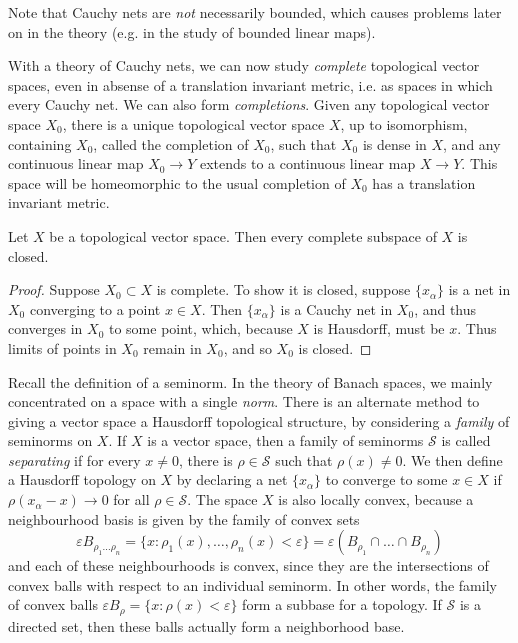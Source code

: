 Note that Cauchy nets are \emph{not} necessarily bounded, which causes problems later on in the theory (e.g. in the study of bounded linear maps).

With a theory of Cauchy nets, we can now study \emph{complete} topological vector spaces, even in absense of a translation invariant metric, i.e. as spaces in which every Cauchy net. We can also form \emph{completions}. Given any topological vector space $X_0$, there is a unique topological vector space $X$, up to isomorphism, containing $X_0$, called the completion of $X_0$, such that $X_0$ is dense in $X$, and any continuous linear map $X_0 \to Y$ extends to a continuous linear map $X \to Y$. This space will be homeomorphic to the usual completion of $X_0$ has a translation invariant metric.

\begin{theorem}
    Let $X$ be a topological vector space. Then every complete subspace of $X$ is closed.
\end{theorem}
\begin{proof}
    Suppose $X_0 \subset X$ is complete. To show it is closed, suppose $\{ x_\alpha \}$ is a net in $X_0$ converging to a point $x \in X$. Then $\{ x_\alpha \}$ is a Cauchy net in $X_0$, and thus converges in $X_0$ to some point, which, because $X$ is Hausdorff, must be $x$. Thus limits of points in $X_0$ remain in $X_0$, and so $X_0$ is closed.
\end{proof}

Recall the definition of a seminorm. In the theory of Banach spaces, we mainly concentrated on a space with a single \emph{norm}. There is an alternate method to giving a vector space a Hausdorff topological structure, by considering a \emph{family} of seminorms on $X$. If $X$ is a vector space, then a family of seminorms $\mathcal{S}$ is called \emph{separating} if for every $x \neq 0$, there is $\rho \in \mathcal{S}$ such that $\rho(x) \neq 0$. We then define a Hausdorff topology on $X$ by declaring a net $\{ x_\alpha \}$ to converge to some $x \in X$ if $\rho(x_\alpha - x) \to 0$ for all $\rho \in \mathcal{S}$. The space $X$ is also locally convex, because a neighbourhood basis is given by the family of convex sets
%
\[ \varepsilon B_{\rho_1 \dots \rho_n} = \{ x: \rho_1(x), \dots, \rho_n(x) < \varepsilon \} = \varepsilon(B_{\rho_1} \cap \dots \cap B_{\rho_n}) \]
%
and each of these neighbourhoods is convex, since they are the intersections of convex balls with respect to an individual seminorm. In other words, the family of convex balls $\varepsilon B_\rho = \{ x : \rho(x) < \varepsilon \}$ form a subbase for a topology. If $\mathcal{S}$ is a directed set, then these balls actually form a neighborhood base.

